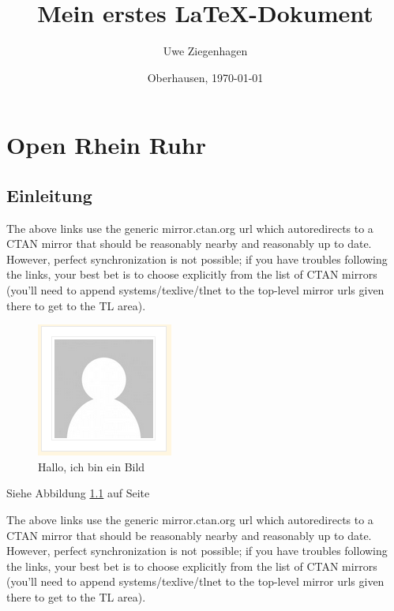 \documentclass[ngerman]{scrreprt}
\author{Uwe Ziegenhagen}
\title{Mein erstes \LaTeX-Dokument}
\date{Oberhausen, \today}
\begin{document}
\maketitle

\tableofcontents

\listoffigures

\listoftables

\chapter{Open Rhein Ruhr}

\section{Einleitung}\label{sec:einleitung}

The above links use the generic mirror.ctan.org url which autoredirects to a CTAN mirror that should be reasonably nearby and reasonably up to date. However, perfect synchronization is not possible; if you have troubles following the links, your best bet is to choose explicitly from the list of CTAN mirrors (you'll need to append systems/texlive/tlnet to the top-level mirror urls given there to get to the TL area). 

\begin{figure}
\begin{center}
\includegraphics{meinbild}
\caption{Hallo, ich bin ein Bild}\label{fig:meinbild}
\end{center}
\end{figure}

Siehe Abbildung \ref{fig:meinbild} auf Seite \pageref{fig:meinbild}

The above links use the generic mirror.ctan.org url which autoredirects to a CTAN mirror that should be reasonably nearby and reasonably up to date. However, perfect synchronization is not possible; if you have troubles following the links, your best bet is to choose explicitly from the list of CTAN mirrors (you'll need to append systems/texlive/tlnet to the top-level mirror urls given there to get to the TL area). 
\end{document}
